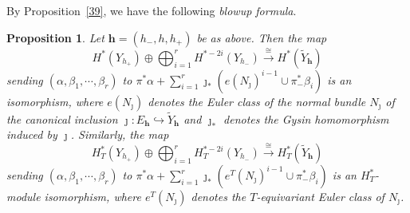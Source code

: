\documentclass[11pt]{article}
\newtheorem{proposition}[theo]{Proposition}
\theoremstyle{definition}
\numberwithin{equation}{section}
\numberwithin{equation}{section}
\newcommand\tY{{\widetilde{Y}}}
\newcommand\beq{\begin{equation}}
\newcommand\eeq{\end{equation}}
\newcommand\bh{\mathbf{h}}
\begin{document}
By Proposition~\ref{39}, we have the following 
 \emph{blowup formula}.
\begin{proposition} \label{16} Let $\bh=(h_-,h,h_+)$ be as above. Then the map
	\beq \label{17} H^*(Y_{h_+}) \oplus \bigoplus_{i=1}^{r}H^{*-2i}(Y_{h_-})\xrightarrow{~\cong~}H^*(\tY_{\bh})\eeq
	sending $(\alpha,\beta_1,\cdots,\beta_{r})$ to  $\pi^*\alpha+
	\sum_{i=1}^{r} \jmath_*(e(N_\jmath)^{i-1}\cup \pi_-^*\beta_i)$
	is an isomorphism,
	where $e(N_\jmath)$ denotes the Euler class of the normal bundle $N_\jmath$ of the canonical inclusion $\jmath:E_{\bh}\hookrightarrow \tY_{\bh}$ 
	and $\jmath_*$ denotes the Gysin homomorphism induced by $\jmath$. 
	Similarly, the map
	\beq \label{18} H^*_T(Y_{h_+}) \oplus \bigoplus_{i=1}^{r}H^{*-2i}_T(Y_{h_-})\xrightarrow{~\cong~}H^*_T(\tY_{\bh})\eeq
	sending $(\alpha,\beta_1,\cdots,\beta_{r})$ to  $\pi^*\alpha+
	\sum_{i=1}^{r} \jmath_*(e^T(N_\jmath)^{i-1}\cup \pi_-^*\beta_i)
	$
	is an $H^*_T$-module isomorphism, where $e^T(N_\jmath)$ denotes the $T$-equivariant Euler class of $N_\jmath$. 
\end{proposition}
\end{document}
